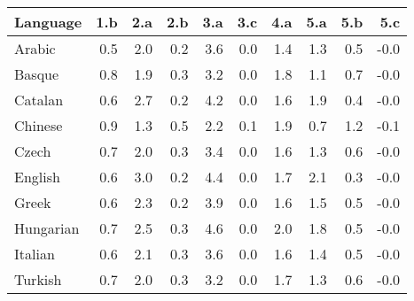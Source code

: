 \begin{tabular}{lrrrrrrrrr}
\toprule
 Language   &   1.b &   2.a &   2.b &   3.a &   3.c &   4.a &   5.a &   5.b &   5.c \\
\midrule
 Arabic     &   0.5 &   2.0 &   0.2 &   3.6 &   0.0 &   1.4 &   1.3 &   0.5 &  -0.0 \\
 Basque     &   0.8 &   1.9 &   0.3 &   3.2 &   0.0 &   1.8 &   1.1 &   0.7 &  -0.0 \\
 Catalan    &   0.6 &   2.7 &   0.2 &   4.2 &   0.0 &   1.6 &   1.9 &   0.4 &  -0.0 \\
 Chinese    &   0.9 &   1.3 &   0.5 &   2.2 &   0.1 &   1.9 &   0.7 &   1.2 &  -0.1 \\
 Czech      &   0.7 &   2.0 &   0.3 &   3.4 &   0.0 &   1.6 &   1.3 &   0.6 &  -0.0 \\
 English    &   0.6 &   3.0 &   0.2 &   4.4 &   0.0 &   1.7 &   2.1 &   0.3 &  -0.0 \\
 Greek      &   0.6 &   2.3 &   0.2 &   3.9 &   0.0 &   1.6 &   1.5 &   0.5 &  -0.0 \\
 Hungarian  &   0.7 &   2.5 &   0.3 &   4.6 &   0.0 &   2.0 &   1.8 &   0.5 &  -0.0 \\
 Italian    &   0.6 &   2.1 &   0.3 &   3.6 &   0.0 &   1.6 &   1.4 &   0.5 &  -0.0 \\
 Turkish    &   0.7 &   2.0 &   0.3 &   3.2 &   0.0 &   1.7 &   1.3 &   0.6 &  -0.0 \\
\bottomrule
\end{tabular}